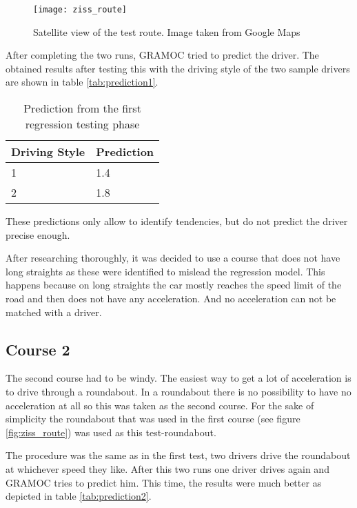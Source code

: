 \begin{figure}[H]
    \centering
    \texttt{[image: ziss\_route]}
    \caption{Satellite view of the test route. Image taken from Google Maps}
    \label{fig:ziss_route}
\end{figure}

After completing the two runs, GRAMOC tried to predict the driver. The obtained results after testing this with the driving style of the two sample drivers are shown in table \vref{tab:prediction1}.

\begin{table}[H]
\centering
\begin{tabular}{|l|l|}
\hline
\textbf{Driving Style} & \textbf{Prediction} \\ \hline
1                      & 1.4                 \\ \hline
2                      & 1.8                 \\ \hline
\end{tabular}
\caption{Prediction from the first regression testing phase}
\label{tab:prediction1}
\end{table}

These predictions only allow to identify tendencies, but do not predict the driver precise enough.

After researching thoroughly, it was decided to use a course that does not have long straights as these were identified to mislead the regression model. This happens because on long straights the car mostly reaches the speed limit of the road and then does not have any acceleration. And no acceleration can not be matched with a driver.


\subsection{Course 2}

The second course had to be windy. The easiest way to get a lot of acceleration is to drive through a roundabout. In a roundabout there is no possibility to have no acceleration at all so this was taken as the second course. For the sake of simplicity the roundabout that was used in the first course (see figure \vref{fig:ziss_route}) was used as this test-roundabout.

The procedure was the same as in the first test, two drivers drive the roundabout at whichever speed they like. After this two runs one driver drives again and GRAMOC tries to predict him. This time, the results were much better as depicted in table \vref{tab:prediction2}.


